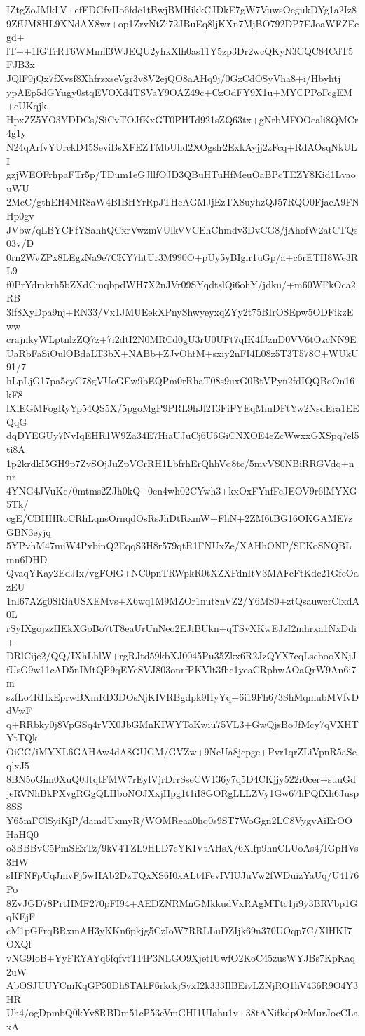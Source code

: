 IZtgZoJMkLV+efFDGfvIIo6fdc1tBwjBMHikkCJDkE7gW7VuwsOcgukDYg1a2Iz8
9ZfUM8HL9XNdAX8wr+op1ZrvNtZi72JBuEq8ljKXn7MjBO792DP7EJoaWFZEcgd+
lT++1fGTrRT6WMmff3WJEQU2yhkXlh0as11Y5zp3Dr2wcQKyN3CQC84CdT5FJB3x
JQlF9jQx7fXvsf8XhfrzxseVgr3v8V2ejQO8aAHq9j/0GzCdOSyVha8+i/Hbyhtj
ypAEp5dGYugy0stqEVOXd4TSVaY9OAZ49c+CzOdFY9X1u+MYCPPoFcgEM+cUKqjk
HpxZZ5YO3YDDCs/SiCvTOJfKxGT0PHTd921sZQ63tx+gNrbMFOOeali8QMCr4g1y
N24qArfvYUrckD45SeviBsXFEZTMbUhd2XOgslr2ExkAyjj2zFcq+RdAOsqNkULI
gzjWEOFrhpaFTr5p/TDum1eGJllfOJD3QBuHTuHfMeuOaBPcTEZY8Kid1LvaouWU
2McC/gthEH4MR8aW4BIBHYrRpJTHcAGMJjEzTX8uyhzQJ57RQO0FjaeA9FNHp0gv
JVbw/qLBYCFfYSahhQCxrVwzmVUlkVVCEhChmdv3DvCG8/jAhofW2atCTQs03v/D
0rn2WvZPx8LEgzNa9e7CKY7htUr3M990O+pUy5yBIgir1uGp/a+c6rETH8We3RL9
f0PrYdmkrh5bZXdCmqbpdWH7X2nJVr09SYqdtslQi6ohY/jdku/+m60WFkOca2RB
3lf8XyDpa9nj+RN33/Vx1JMUEekXPnyShwyeyxqZYy2t75BIrOSEpw5ODFikzEww
crajnkyWLptnlzZQ7z+7i2dtI2N0MRCd0gU3rU0UFt7qIK4fJznD0VV6tOzcNN9E
UaRbFaSiOulOBdaLT3bX+NABb+ZJvOhtM+sxiy2nFI4L08z5T3T578C+WUkU91/7
hLpLjG17pa5cyC78gVUoGEw9bEQPm0rRhaT08s9uxG0BtVPyn2fdIQQBoOn16kF8
lXiEGMFogRyYp54QS5X/5pgoMgP9PRL9hJl213FiFYEqMmDFtYw2NsdEra1EEQqG
dqDYEGUy7NvIqEHR1W9Za34E7HiaUJuCj6U6GiCNXOE4eZcWwxxGXSpq7el5ti8A
1p2krdkI5GH9p7ZvSOjJuZpVCrRH1LbfrhErQhhVq8tc/5mvVS0NBiRRGVdq+nnr
4YNG4JVuKc/0mtms2ZJh0kQ+0cn4wh02CYwh3+kxOxFYnfFcJEOV9r6lMYXG5Tk/
cgE/CBHHRoCRhLqnsOrnqdOsRsJhDtRxmW+FhN+2ZM6tBG16OKGAME7zGBN3eyjq
5YPvhM47miW4PvbinQ2EqqS3H8r579qtR1FNUxZe/XAHhONP/SEKoSNQBLmn6DHD
QvaqYKay2EdJIx/vgFOlG+NC0pnTRWpkR0tXZXFdnItV3MAFcFtKdc21GfeOazEU
1nl67AZg0SRihUSXEMvs+X6wq1M9MZOr1nut8nVZ2/Y6MS0+ztQsauwcrClxdA0L
rSyIXgojzzHEkXGoBo7tT8eaUrUnNeo2EJiBUkn+qTSvXKwEJzI2mhrxa1NxDdi+
DRlCije2/QQ/IXhLhlW+rgRJtd59kbXJ0045Pu35Zkx6R2JzQYX7cqLscbooXNjJ
fUsG9w11cAD5nIMtQP9qEYeSVJ803onrfPKVlt3fhc1yeaCRphwAOaQrW9An6i7m
szfLo4RHxEprwBXmRD3DOsNjKIVRBgdpk9HyYq+6i19Fh6/3ShMqmubMVfvDdVwF
q+RRbky0j8VpGSq4rVX0JbGMnKIWYToKwiu75VL3+GwQjsBoJfMcy7qVXHTYtTQk
OiCC/iMYXL6GAHAw4dA8GUGM/GVZw+9NeUa8jcpge+Pvr1qrZLiVpnR5aSeqlxJ5
8BN5oGlm0XuQ0JtqtFMW7rEylVjrDrrSseCW136y7q5D4CKjjy522r0cer+suuGd
jeRVNhBkPXvgRGgQLHboNOJXxjHpg1t1iI8GORgLLLZVy1Gw67hPQfXh6Jusp8SS
Y65mFClSyiKjP/damdUxmyR/WOMReaa0hq0s9ST7WoGgn2LC8VygvAiErOOHaHQ0
o3BBBvC5PmSExTz/9kV4TZL9HLD7cYKIVtAHsX/6Xlfp9hnCLUoAs4/IGpHVs3HW
sHFNFpUqJmvFj5wHAb2DzTQxXS6I0xALt4FevIVlUJuVw2fWDuizYaUq/U4176Po
8ZvJGD78PrtHMF270pFI94+AEDZNRMnGMkkudVxRAgMTtc1ji9y3BRVbp1GqKEjF
cM1pGFrqBRxmAH3yKKn6pkjg5CzIoW7RRLLuDZIjk69n370UOqp7C/XlHKI7OXQl
vNG9IoB+YyFRYAYq6fqfvtTI4P3NLGO9XjetIUwfO2KoC45zusWYJBs7KpKaq2uW
AbOSJUUYCmKqGP50Dh8TAkF6rkckjSvxI2k333IlBEivLZNjRQ1hV436R9O4Y3HR
Uh4/ogDpmbQ0kYv8RBDm51cP53eVmGHI1UIahu1v+38tANifkdpOrMurJocCLaxA

